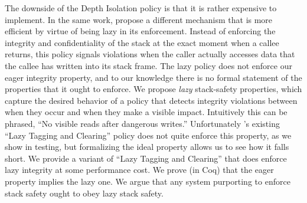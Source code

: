 \documentclass[acmsmall,review,anonymous]{acmart}\settopmatter{printfolios=true,printccs=false,printacmref=false}
\begin{document}
The downside of the Depth Isolation policy is that it is rather expensive to implement.
In the same work, \citeauthor{DBLP:conf/sp/RoesslerD18} propose a different mechanism
that is more efficient by virtue of being lazy in its enforcement.
Instead of enforcing the integrity and confidentiality of the stack at the
exact moment when a callee returns, this policy signals violations when the
caller actually accesses data that the callee has written into its stack
frame. \ifaftersubmission{}\fi
The lazy policy does not enforce our eager integrity property, and to our
knowledge there is no formal statement of the properties that it ought to enforce.
We propose {\em lazy} stack-safety properties, which capture the desired behavior of a
policy that detects integrity violations between when they occur and when they make
a visible impact. Intuitively this can be phrased, ``No visible reads after dangerous
writes.'' Unfortunately \citeauthor{DBLP:conf/sp/RoesslerD18}'s existing
``Lazy Tagging and Clearing'' policy does not quite enforce this property, as we show in
testing, but formalizing the ideal property allows us to see how it falls short.
We provide a variant of ``Lazy Tagging and Clearing'' that does enforce lazy integrity
at some performance cost. We prove (in Coq) that the eager property implies the lazy one.
We argue that any system purporting to enforce stack safety ought to obey lazy stack safety.

\end{document}
